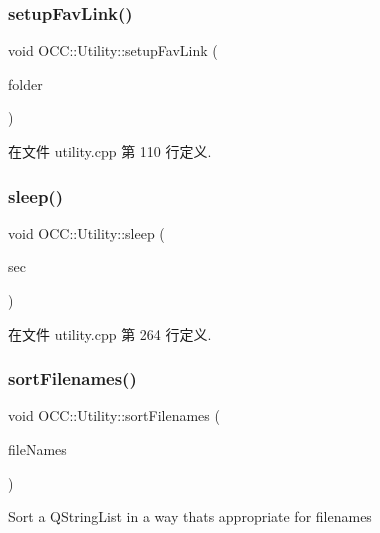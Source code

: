 \subsubsection{\texorpdfstring{setup\+Fav\+Link()}{setupFavLink()}}
{\footnotesize\ttfamily void O\+C\+C\+::\+Utility\+::setup\+Fav\+Link (\begin{DoxyParamCaption}\item[{const Q\+String \&}]{folder }\end{DoxyParamCaption})}



在文件 utility.\+cpp 第 110 行定义.

\mbox{\label{namespace_o_c_c_1_1_utility_a2a5852559fec33206166584c0bdc0827}} 
\subsubsection{\texorpdfstring{sleep()}{sleep()}}
{\footnotesize\ttfamily void O\+C\+C\+::\+Utility\+::sleep (\begin{DoxyParamCaption}\item[{int}]{sec }\end{DoxyParamCaption})}



在文件 utility.\+cpp 第 264 行定义.

\mbox{\label{namespace_o_c_c_1_1_utility_a4c3a05eded7862ce624511132325d0b3}} 
\subsubsection{\texorpdfstring{sort\+Filenames()}{sortFilenames()}}
{\footnotesize\ttfamily void O\+C\+C\+::\+Utility\+::sort\+Filenames (\begin{DoxyParamCaption}\item[{Q\+String\+List \&}]{file\+Names }\end{DoxyParamCaption})}



Sort a Q\+String\+List in a way that\textquotesingle{}s appropriate for filenames 




